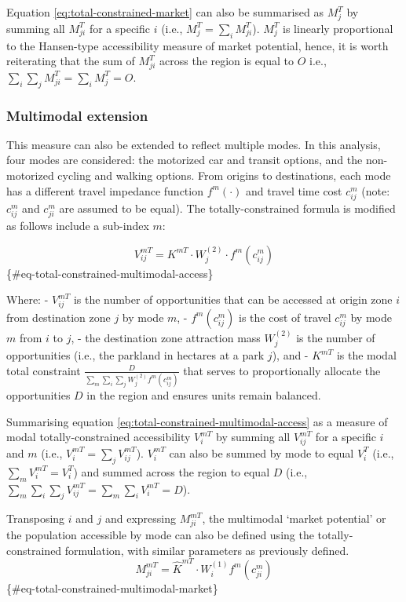 \documentclass[
11pt, %
oneside, %
english, %
singlespacing, %
]{macthesis} %
\begin{document}
Equation \ref{eq:total-constrained-market} can also be summarised as \(M^T_j\) by summing all \(M^T_{ji}\) for a specific \(i\) (i.e., \(M^T_j = \sum_i M^T_{ji}\)). \(M^T_j\) is linearly proportional to the Hansen-type accessibility measure of market potential, hence, it is worth reiterating that the sum of \(M^T_{ji}\) across the region is equal to \(O\) i.e., \(\sum_i\sum_j M^T_{ji} = \sum_i M^T_{j} = O\).

\subsubsection{Multimodal extension}\label{multimodal-extension}

This measure can also be extended to reflect multiple modes. In this analysis, four modes are considered: the motorized car and transit options, and the non-motorized cycling and walking options. From origins to destinations, each mode has a different travel impedance function \(f^m(\cdot)\) and travel time cost \(c^m_{ij}\) (note: \(c^m_{ij}\) and \(c^m_{ji}\) are assumed to be equal). The totally-constrained formula is modified as follows include a sub-index \(m\):

\[
V^{mT}_{ij} = K^{mT} \cdot W_j^{(2)} \cdot f^m(c^m_{ij})
\]\{\#eq-total-constrained-multimodal-access\}

Where:
- \(V^{mT}_{ij}\) is the number of opportunities that can be accessed at origin zone \(i\) from destination zone \(j\) by mode \(m\),
- \(f^m(c^m_{ij})\) is the cost of travel \(c^m_{ij}\) by mode \(m\) from \(i\) to \(j\),
- the destination zone attraction mass \(W_j^{(2)}\) is the number of opportunities (i.e., the parkland in hectares at a park \(j\)), and
- \(K^{mT}\) is the modal total constraint \(\frac{D}{\sum_m\sum_i\sum_j W^{(2)}_jf^m(c^m_{ij})}\) that serves to proportionally allocate the opportunities \(D\) in the region and ensures units remain balanced.

Summarising equation \ref{eq:total-constrained-multimodal-access} as a measure of modal totally-constrained accessibility \(V^{mT}_i\) by summing all \(V^{mT}_{ij}\) for a specific \(i\) and \(m\) (i.e., \(V^{mT}_i = \sum_j V^{mT}_{ij}\)). \(V^{mT}_i\) can also be summed by mode to equal \(V^{T}_i\) (i.e., \(\sum_m V^{mT}_i = V^{T}_i\)) and summed across the region to equal \(D\) (i.e., \(\sum_m\sum_i\sum_j V^{mT}_{ij} = \sum_m\sum_i V^{mT}_{i} = D\)).

Transposing \(i\) and \(j\) and expressing \(M^{mT}_{ji}\), the multimodal `market potential' or the population accessible by mode can also be defined using the totally-constrained formulation, with similar parameters as previously defined.
\[
M^{mT}_{ji} = \hat K^{mT} \cdot W_i^{(1)} f^m(c^m_{ji})
\] \{\#eq-total-constrained-multimodal-market\}
\end{document}
